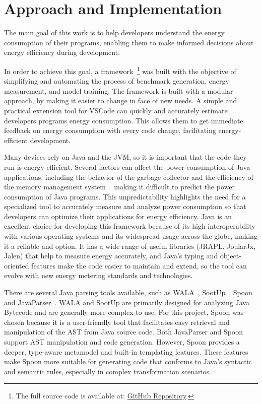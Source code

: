 \chapter{Approach and Implementation}\label{chapter:approach}



The main goal of this work is to help developers understand the energy consumption of their programs, enabling them to make informed decisions about energy efficiency during development.

In order to achieve this goal, a framework~\footnote{The full source code is available at: \href{https://github.com/afonsoCarreira1/EnergyAwareProgrammingFramework}{GitHub Repository}.} was built with the objective of simplifying and automating the process of benchmark generation, energy measurement, and model training. The framework is built with a modular approach, by making it easier to change in face of new needs. A simple and practical extension tool for VSCode  can quickly and accurately estimate developers programs energy consumption. This allows them to get immediate feedback on energy consumption with every code change, facilitating energy-efficient development.




Many devices rely on Java and the JVM, so it is important that the code they run is energy efficient. Several factors can affect the power consumption of Java applications, including the behavior of the garbage collector and the efficiency of the memory management system ~\cite{10.5555/1267847.1267870} making it difficult to predict the power consumption of Java programs. This unpredictability highlights the need for a specialized tool to accurately measure and analyze power consumption so that developers can optimize their applications for energy efficiency.
Java is an excellent choice for developing this framework because of its high interoperability with various operating systems and its widespread usage across the globe, making it a reliable and option. It has a wide range of useful libraries (JRAPL, JoularJx, Jalen) that help to measure energy accurately, and Java's typing and object-oriented features make the code easier to maintain and extend, so the tool can evolve with new energy metering standards and technologies.

There are several Java parsing tools available, such as WALA~\cite{wala_main}, SootUp~\cite{sootup_main}, Spoon~\cite{spoon_main} and JavaParser~\cite{javaParser}. WALA and SootUp are primarily designed for analyzing Java Bytecode and are generally more complex to use. For this project, Spoon was chosen because it is a user-friendly tool that facilitates easy retrieval and manipulation of the AST from Java source code. Both JavaParser and Spoon support AST manipulation and code generation. However, Spoon provides a deeper, type-aware metamodel and built-in templating features. These features make Spoon more suitable for generating code that conforms to Java’s syntactic and semantic rules, especially in complex transformation scenarios.



